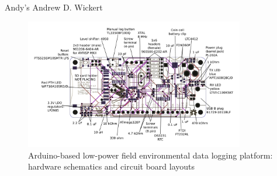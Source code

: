 \documentclass{beamer}
\begin{document}
\begin{frame}{Andy's Andrew D. Wickert}
\begin{figure}
\centering
\includegraphics[height=5.7cm]{graphics/ALog_drawing.PDF}
\caption{Arduino-based low-power field environmental data logging platform: hardware schematics and circuit board layouts\cite{ALog-BottleLogger}}

\end{figure}
\end{frame}
\end{document}
